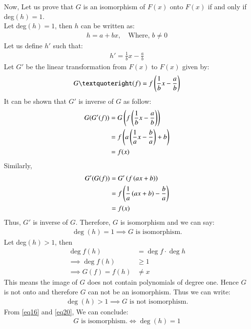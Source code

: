 \documentclass[journal,12pt,twocolumn]{IEEEtran}
\begin{document}
Now, Let us prove that $G$ is an isomorphism of $F(x)$ onto $F(x)$ if and only if deg$(h)=1$. \\
Let deg$(h)=1$, then $h$ can be written as:
\begin{align}
    h=a+bx, \quad \text{Where, }b \ne 0
\end{align}
Let us define $h'$ such that:
\begin{align}
    h'=\frac1bx-\frac ab
\end{align}
Let $G'$ be the linear transformation from $F(x)$ to $F(x)$ given by:
\begin{align}
    G’(f)=f\brak{\frac1bx-\frac ab}
\end{align}
It can be shown that $G'$ is inverse of $G$ as follow:
\begin{align}
    G(G'(f))&=G\left(f\left(\frac1bx-\frac ab\right)\right)\\
    &=f\left(a\left(\frac1ax-\frac ba\right)+b\right)\\
    &=f(x)
\end{align}
Similarly, 
\begin{align}
    G'(G(f))&=G'\left(f\left(ax+b\right)\right)\\
    &=f\left(\frac1a\left(ax+b\right)-\frac ba\right)\\
    &=f(x)
\end{align}
Thus, $G'$ is inverse of $G$. Therefore, $G$ is isomorphism and we can say: 
\begin{align}
    \boxed{\deg(h)=1 \implies \text{$G$ is isomorphism.}} \label{eq16}
\end{align}
Let deg$(h)>1$, then 
\begin{align}
    \deg f(h)&=\deg f\cdot \deg h \\
    \implies \deg f(h)&\geq 1\\
    \implies G(f)=f(h) &\ne x
\end{align}
This means the image of $G$ does not contain polynomials of degree one. Hence $G$ is not onto and therefore $G$ can not be an isomorphism. Thus we can write:
\begin{align}
    \boxed{\deg(h)>1 \implies \text{$G$ is not isomorphism.}} \label{eq20} 
\end{align}
From \eqref{eq16} and \eqref{eq20}, We can conclude:
\begin{align}
    \boxed{\text{$G$ is isomorphism.} \iff \deg(h)=1}  
\end{align}
\end{document}
